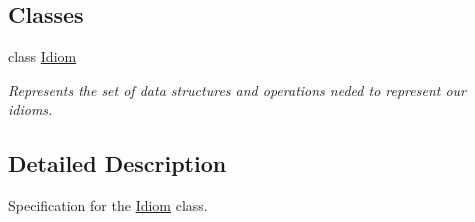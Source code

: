 \subsection*{Classes}
\begin{DoxyCompactItemize}
\item 
class \hyperlink{classIdiom}{Idiom}
\begin{DoxyCompactList}\small\item\em Represents the set of data structures and operations neded to represent our idioms. \end{DoxyCompactList}\end{DoxyCompactItemize}


\subsection{Detailed Description}
Specification for the \hyperlink{classIdiom}{Idiom} class. 

